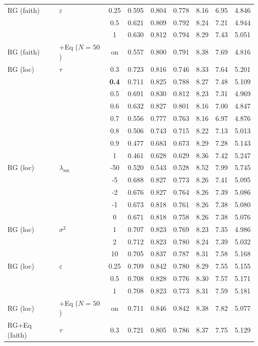 \begin{longtable}{@{}l l c c c c c c c@{}}
RG (faith) & $\varepsilon$ & 0.25 & 0.595 & 0.804 & 0.778 & 8.16 & 6.95 & 4.846 \\
 &  & 0.5 & 0.621 & 0.809 & 0.792 & 8.24 & 7.21 & 4.944 \\
 &  & 1 & 0.630 & 0.812 & 0.794 & 8.29 & 7.43 & 5.051 \\
\midrule
RG (faith) & +Eq ($N{=}50$) & on & 0.557 & 0.800 & 0.791 & 8.38 & 7.69 & 4.816 \\
\midrule
RG (loc) & $\tau$ & 0.3 & 0.723 & 0.816 & 0.746 & 8.33 & 7.64 & 5.201 \\
 &  & \textbf{0.4} & 0.711 & 0.825 & 0.788 & 8.27 & 7.48 & 5.109 \\
 &  & 0.5 & 0.691 & 0.830 & 0.812 & 8.23 & 7.31 & 4.969 \\
 &  & 0.6 & 0.632 & 0.827 & 0.801 & 8.16 & 7.00 & 4.847 \\
 &  & 0.7 & 0.556 & 0.777 & 0.763 & 8.16 & 6.97 & 4.876 \\
 &  & 0.8 & 0.506 & 0.743 & 0.715 & 8.22 & 7.13 & 5.013 \\
 &  & 0.9 & 0.477 & 0.683 & 0.673 & 8.29 & 7.28 & 5.143 \\
 &  & 1 & 0.461 & 0.628 & 0.629 & 8.36 & 7.42 & 5.247 \\
\midrule
RG (loc) & $\lambda_{\mathrm{sm}}$ & {-}50 & 0.520 & 0.543 & 0.528 & 8.52 & 7.99 & 5.745 \\
 &  & {-}5 & 0.688 & 0.827 & 0.773 & 8.26 & 7.41 & 5.095 \\
 &  & {-}2 & 0.676 & 0.827 & 0.764 & 8.26 & 7.39 & 5.086 \\
 &  & {-}1 & 0.673 & 0.818 & 0.761 & 8.26 & 7.38 & 5.080 \\
 &  & 0 & 0.671 & 0.818 & 0.758 & 8.26 & 7.38 & 5.076 \\
\midrule
RG (loc) & $\sigma^2$ & 1 & 0.707 & 0.823 & 0.769 & 8.23 & 7.35 & 4.986 \\
 &  & 2 & 0.712 & 0.823 & 0.780 & 8.24 & 7.39 & 5.032 \\
 &  & 10 & 0.705 & 0.837 & 0.787 & 8.31 & 7.58 & 5.168 \\
\midrule
RG (loc) & $\varepsilon$ & 0.25 & 0.709 & 0.842 & 0.780 & 8.29 & 7.55 & 5.155 \\
 &  & 0.5 & 0.708 & 0.828 & 0.776 & 8.30 & 7.57 & 5.171 \\
 &  & 1 & 0.708 & 0.823 & 0.773 & 8.31 & 7.59 & 5.181 \\
\midrule
RG (loc) & +Eq ($N{=}50$) & on & 0.711 & 0.846 & 0.842 & 8.38 & 7.82 & 5.077 \\
\midrule
RG+Eq (faith) & $\tau$ & 0.3 & 0.721 & 0.805 & 0.786 & 8.37 & 7.75 & 5.129 \\

\end{longtable}
